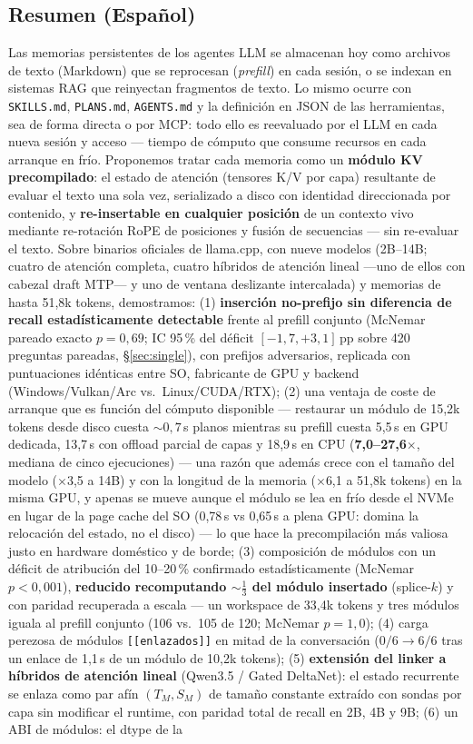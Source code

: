 \documentclass[11pt]{article}
\newcommand{\code}[1]{\texttt{#1}}
\begin{document}
\subsection*{Resumen (Español)}
\noindent
Las memorias persistentes de los agentes LLM se almacenan hoy como archivos de texto (Markdown) que se reprocesan (\emph{prefill}) en cada sesión, o se indexan en sistemas RAG que reinyectan fragmentos de texto. Lo mismo ocurre con \code{SKILLS.md}, \code{PLANS.md}, \code{AGENTS.md} y la definición en JSON de las herramientas, sea de forma directa o por MCP: todo ello es reevaluado por el LLM en cada nueva sesión y acceso --- tiempo de cómputo que consume recursos en cada arranque en frío. Proponemos tratar cada memoria como un \textbf{módulo KV precompilado}: el estado de atención (tensores K/V por capa) resultante de evaluar el texto una sola vez, serializado a disco con identidad direccionada por contenido, y \textbf{re-insertable en cualquier posición} de un contexto vivo mediante re-rotación RoPE de posiciones y fusión de secuencias --- sin re-evaluar el texto. Sobre binarios oficiales de llama.cpp, con nueve modelos (2B--14B; cuatro de atención completa, cuatro híbridos de atención lineal ---uno de ellos con cabezal draft MTP--- y uno de ventana deslizante intercalada) y memorias de hasta 51,8k tokens, demostramos: (1) \textbf{inserción no-prefijo sin diferencia de recall estadísticamente detectable} frente al prefill conjunto (McNemar pareado exacto $p=0{,}69$; IC 95\,\% del déficit $[-1{,}7, +3{,}1]$\,pp sobre 420 preguntas pareadas, \S\ref{sec:single}), con prefijos adversarios, replicada con puntuaciones idénticas entre SO, fabricante de GPU y backend (Windows/Vulkan/Arc vs.\ Linux/CUDA/RTX); (2) una ventaja de coste de arranque que es función del cómputo disponible --- restaurar un módulo de 15,2k tokens desde disco cuesta ${\sim}0{,}7$\,s planos mientras su prefill cuesta 5,5\,s en GPU dedicada, 13,7\,s con offload parcial de capas y 18,9\,s en CPU (\textbf{7,0--27,6$\times$}, mediana de cinco ejecuciones) --- una razón que además crece con el tamaño del modelo ($\times$3,5 a 14B) y con la longitud de la memoria ($\times$6,1 a 51,8k tokens) en la misma GPU, y apenas se mueve aunque el módulo se lea en frío desde el NVMe en lugar de la page cache del SO (0,78\,s vs 0,65\,s a plena GPU: domina la relocación del estado, no el disco) --- lo que hace la precompilación más valiosa justo en hardware doméstico y de borde; (3) composición de módulos con un déficit de atribución del 10--20\,\% confirmado estadísticamente (McNemar $p<0{,}001$), \textbf{reducido recomputando ${\sim}\tfrac{1}{3}$ del módulo insertado} (splice-$k$) y con paridad recuperada a escala --- un workspace de 33,4k tokens y tres módulos iguala al prefill conjunto (106 vs.\ 105 de 120; McNemar $p=1{,}0$); (4) carga perezosa de módulos \code{[[enlazados]]} en mitad de la conversación ($0/6 \to 6/6$ tras un enlace de 1,1\,s de un módulo de 10,2k tokens); (5) \textbf{extensión del linker a híbridos de atención lineal} (Qwen3.5 / Gated DeltaNet): el estado recurrente se enlaza como par afín $(T_M, S_M)$ de tamaño constante extraído con sondas por capa sin modificar el runtime, con paridad total de recall en 2B, 4B y 9B; (6) un ABI de módulos: el dtype de la 
\end{document}
